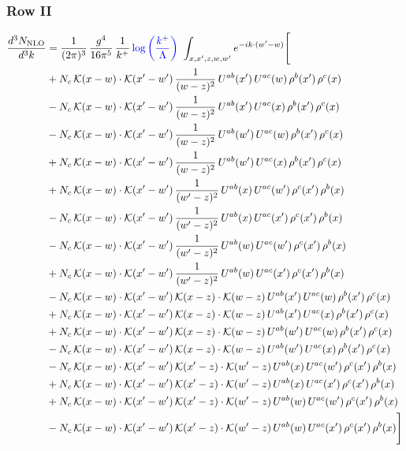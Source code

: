 \documentclass[9pt]{article}
\numberwithin{equation}{section}
\begin{document}
\subsubsection{Row II}
\begin{align}
\frac{d^3N_{\rm NLO}}{d^3k} & =  \frac{1}{(2\pi)^{3}}\,\frac{g^{4}}{16\pi^{5}}\,\frac{1}{k^{+}}\,{\color{blue}\log{\left(\frac{k^{+}}{\Lambda}\right)}}\,\, \int_{x,x',z,w,w'}e^{-ik\cdot(w'-w)}\Bigg[\notag\\
&+N_{c}\,\mathcal{K}(x-w)\cdot\mathcal{K}(x'-w')\,\frac{1}{(w-z)^{2}}\,U^{ab}(x')\,U^{ac}(w)\,\rho^{b}(x')\,\rho^{c}(x)\notag\\
&-N_{c}\,\mathcal{K}(x-w)\cdot\mathcal{K}(x'-w')\,\frac{1}{(w-z)^{2}}\,U^{ab}(x')\,U^{ac}(x)\,\rho^{b}(x')\,\rho^{c}(x)\notag\\
&-N_{c}\,\mathcal{K}(x-w)\cdot\mathcal{K}(x'-w')\,\frac{1}{(w-z)^{2}}\,U^{ab}(w')\,U^{ac}(w)\,\rho^{b}(x')\,\rho^{c}(x)\notag\\
&+N_{c}\,\mathcal{K}(x-w)\cdot\mathcal{K}(x'-w')\,\frac{1}{(w-z)^{2}}\,U^{ab}(w')\,U^{ac}(x)\,\rho^{b}(x')\,\rho^{c}(x)\notag\\
&+N_{c}\,\mathcal{K}(x-w)\cdot\mathcal{K}(x'-w')\,\frac{1}{(w'-z)^{2}}\,U^{ab}(x)\,U^{ac}(w')\,\rho^{c}(x')\,\rho^{b}(x)\notag\\
&-N_{c}\,\mathcal{K}(x-w)\cdot\mathcal{K}(x'-w')\,\frac{1}{(w'-z)^{2}}\,U^{ab}(x)\,U^{ac}(x')\,\rho^{c}(x')\,\rho^{b}(x)\notag\\
&-N_{c}\,\mathcal{K}(x-w)\cdot\mathcal{K}(x'-w')\,\frac{1}{(w'-z)^{2}}\,U^{ab}(w)\,U^{ac}(w')\,\rho^{c}(x')\,\rho^{b}(x)\notag\\
&+N_{c}\,\mathcal{K}(x-w)\cdot\mathcal{K}(x'-w')\,\frac{1}{(w'-z)^{2}}\,U^{ab}(w)\,U^{ac}(x')\,\rho^{c}(x')\,\rho^{b}(x)\notag\\
&-N_{c}\,\mathcal{K}(x-w)\cdot\mathcal{K}(x'-w')\,\mathcal{K}(x-z)\cdot\mathcal{K}(w-z)\,U^{ab}(x')\,U^{ac}(w)\,\rho^{b}(x')\,\rho^{c}(x)\notag\\
&+N_{c}\,\mathcal{K}(x-w)\cdot\mathcal{K}(x'-w')\,\mathcal{K}(x-z)\cdot\mathcal{K}(w-z)\,U^{ab}(x')\,U^{ac}(x)\,\rho^{b}(x')\,\rho^{c}(x)\notag\\
&+N_{c}\,\mathcal{K}(x-w)\cdot\mathcal{K}(x'-w')\,\mathcal{K}(x-z)\cdot\mathcal{K}(w-z)\,U^{ab}(w')\,U^{ac}(w)\,\rho^{b}(x')\,\rho^{c}(x)\notag\\
&-N_{c}\,\mathcal{K}(x-w)\cdot\mathcal{K}(x'-w')\,\mathcal{K}(x-z)\cdot\mathcal{K}(w-z)\,U^{ab}(w')\,U^{ac}(x)\,\rho^{b}(x')\,\rho^{c}(x)\notag\\
&-N_{c}\,\mathcal{K}(x-w)\cdot\mathcal{K}(x'-w')\,\mathcal{K}(x'-z)\cdot\mathcal{K}(w'-z)\,U^{ab}(x)\,U^{ac}(w')\,\rho^{c}(x')\,\rho^{b}(x)\notag\\
&+N_{c}\,\mathcal{K}(x-w)\cdot\mathcal{K}(x'-w')\,\mathcal{K}(x'-z)\cdot\mathcal{K}(w'-z)\,U^{ab}(x)\,U^{ac}(x')\,\rho^{c}(x')\,\rho^{b}(x)\notag\\
&+N_{c}\,\mathcal{K}(x-w)\cdot\mathcal{K}(x'-w')\,\mathcal{K}(x'-z)\cdot\mathcal{K}(w'-z)\,U^{ab}(w)\,U^{ac}(w')\,\rho^{c}(x')\,\rho^{b}(x)\notag\\
&-N_{c}\,\mathcal{K}(x-w)\cdot\mathcal{K}(x'-w')\,\mathcal{K}(x'-z)\cdot\mathcal{K}(w'-z)\,U^{ab}(w)\,U^{ac}(x')\,\rho^{c}(x')\,\rho^{b}(x)\Bigg]
\end{align}
\end{document}
